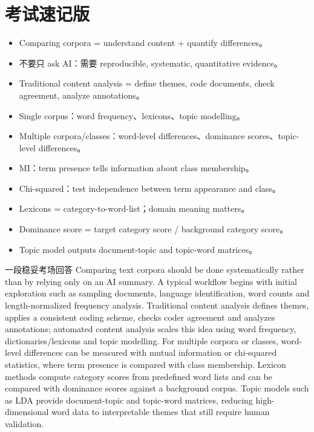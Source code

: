 \documentclass[11pt,a4paper]{ctexart}
\begin{document}
\section{考试速记版}
\begin{itemize}
\item Comparing corpora = understand content + quantify differences。
\item 不要只 ask AI：需要 reproducible, systematic, quantitative evidence。
\item Traditional content analysis = define themes, code documents, check agreement, analyze annotations。
\item Single corpus：word frequency、lexicons、topic modelling。
\item Multiple corpora/classes：word-level differences、dominance scores、topic-level differences。
\item MI：term presence tells information about class membership。
\item Chi-squared：test independence between term appearance and class。
\item Lexicons = category-to-word-list；domain meaning matters。
\item Dominance score = target category score / background category score。
\item Topic model outputs document-topic and topic-word matrices。
\end{itemize}
\begin{callout}{一段稳妥考场回答}
Comparing text corpora should be done systematically rather than by relying only on an AI summary. A typical workflow begins with initial exploration such as sampling documents, language identification, word counts and length-normalized frequency analysis. Traditional content analysis defines themes, applies a consistent coding scheme, checks coder agreement and analyzes annotations; automated content analysis scales this idea using word frequency, dictionaries/lexicons and topic modelling. For multiple corpora or classes, word-level differences can be measured with mutual information or chi-squared statistics, where term presence is compared with class membership. Lexicon methods compute category scores from predefined word lists and can be compared with dominance scores against a background corpus. Topic models such as LDA provide document-topic and topic-word matrices, reducing high-dimensional word data to interpretable themes that still require human validation.
\end{callout}
\end{document}
